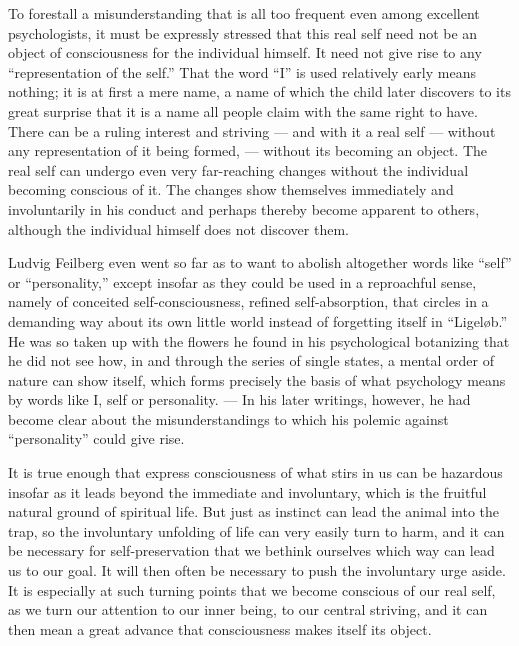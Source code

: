 \documentclass[12pt]{book}
\newcommand{\opage}[1]{\marginnote{\footnotesize\textit{[#1]}}}
\begin{document}
To forestall a misunderstanding that is all too frequent even among excellent
psychologists, it must be expressly stressed that this real self need not be an
object of consciousness for the individual himself. It need not give rise to any
``representation of the self.'' That the word ``I'' is used relatively early
means nothing; it is at first a mere name, a name of which the child later
discovers to its great surprise that it is a name all people claim with the same
right to have. There can be a ruling interest and striving --- and with it a real
self --- without any representation of it being formed, --- without its becoming
an object. The real self can undergo even very far-reaching changes
\opage{12}without the individual becoming conscious of it. The changes show
themselves immediately and involuntarily in his conduct and perhaps thereby
become apparent to others, although the individual himself does not discover
them.

Ludvig Feilberg even went so far as to want to abolish altogether words like
``self'' or ``personality,'' except insofar as they could be used in a
reproachful sense, namely of conceited self-consciousness, refined
self-absorption, that circles in a demanding way about its own little world
instead of forgetting itself in ``Ligeløb.'' %
He was so taken up with the
flowers he found in his psychological botanizing that he did not see how, in and
through the series of single states, a mental order of nature can show itself,
which forms precisely the basis of what psychology means by words like I, self or
personality. --- In his later writings, however, he had become clear about the
misunderstandings to which his polemic against ``personality'' could give rise.

It is true enough that express consciousness of what stirs in us can be
hazardous insofar as it leads beyond the immediate and involuntary, which is the
fruitful natural ground of spiritual life. But just as instinct can lead the
animal into the trap, so the involuntary unfolding of life can very easily turn
to harm, and it can be necessary for self-preservation that we bethink ourselves
which way can lead us to our goal. It will then often be necessary to push the
involuntary urge aside. It is especially at such turning points that we become
conscious of our real self, as we turn our attention to our inner being, to our
central striving, and it can then mean a great advance that consciousness makes
itself its object.
\end{document}
